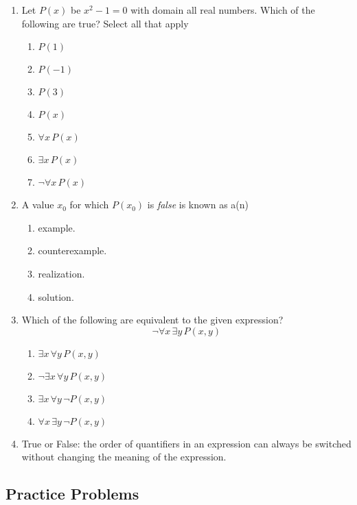 \begin{enumerate}
  \item Let $P(x)$ be $x^2 - 1 = 0$ with domain all real numbers. Which of the following are true? Select all that apply
  \begin{enumerate}
      \item $P(1)$
      \item $P(-1)$
      \item $P(3)$
      \item $P(x)$
      \item $\forall x \, P(x)$
      \item $\exists x \, P(x)$
      \item $\neg \forall x \, P(x)$
  \end{enumerate}
  
  \item A value $x_0$ for which $P(x_0)$ is \emph{false} is known as a(n) \underline{\phantom{counterexample}\qquad\qquad}
  \begin{enumerate}
      \item example.
      \item counterexample.
      \item realization.
      \item solution.
  \end{enumerate}
  
  \item Which of the following are equivalent to the given expression? 
  \[
    \neg \forall x \, \exists y \, P(x,y)
  \]
  \begin{enumerate}
      \item $\exists x \, \forall y \, P(x,y)$
      \item  $\neg \exists x \, \forall y \, P(x,y)$
      \item  $\exists x \, \forall y \, \neg P(x,y)$
      \item  $\forall x \, \exists y \, \neg P(x,y)$
  \end{enumerate}
  
  \item True or False: the order of quantifiers in an expression can always be switched without changing the meaning of the expression.
\end{enumerate}

\subsection*{Practice Problems}


